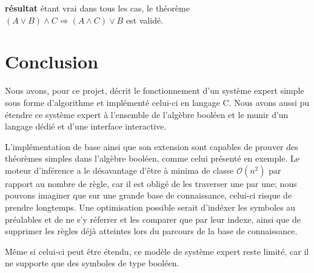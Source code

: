\documentclass[12pt]{article}
\begin{document}
\textbf{résultat} étant vrai dans tous les cas, le théorème $(A \lor B) \land C \Rightarrow (A \land C) \lor B$ est validé.

\newpage

\section{Conclusion}

Nous avons, pour ce projet, décrit le fonctionnement d'un système expert simple sous forme d'algorithme et implémenté celui-ci en langage C.
Nous avons aussi pu étendre ce système expert à l'ensemble de l'algèbre booléen et le munir d'un langage dédié et d'une interface interactive.

L'implémentation de base ainsi que son extension sont capables de prouver des théorèmes simples dans l'algèbre booléen, comme celui présenté en exemple.
Le moteur d'inférence a le désavantage d'être à minima de classe $\mathcal{O}(n^2)$ par rapport au nombre de règle, car il est obligé de les traverser une par une; nous pouvons imaginer que sur une grande base de connaissance, celui-ci risque de prendre longtemps.
Une optimisation possible serait d'indéxer les symboles au préalables et de ne s'y réferrer et les comparer que par leur indexe, ainsi que de supprimer les règles déjà atteintes lors du parcours de la base de connaissance.

Même si celui-ci peut être étendu, ce modèle de système expert reste limité, car il ne supporte que des symboles de type booléen.

\newpage
{}
\listofalgorithms
\end{document}
